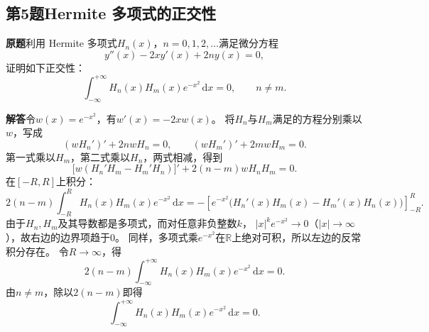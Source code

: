 \documentclass[11pt,a4paper]{ctexart}
\newcommand{\R}{\mathbb R}
\newcommand{\dd}{\,\mathrm d}
\newcommand{\problem}{\par\textbf{原题}\quad}
\newcommand{\solution}{\par\medskip\textbf{解答}\quad}
\begin{document}
\newpage
\subsection*{第5题\quad Hermite 多项式的正交性}
\problem 利用 Hermite 多项式$H_n(x)$，$n=0,1,2,\ldots$满足微分方程
\[
 y''(x)-2xy'(x)+2ny(x)=0,
\]
证明如下正交性：
\[
 \int_{-\infty}^{+\infty}H_n(x)H_m(x)e^{-x^2}\dd x=0,
 \qquad n\ne m.
\]

\solution 令$w(x)=e^{-x^2}$，有$w'(x)=-2xw(x)$。
将$H_n$与$H_m$满足的方程分别乘以$w$，写成
\[
 (wH_n')'+2nwH_n=0,\qquad
 (wH_m')'+2mwH_m=0.
\]
第一式乘以$H_m$，第二式乘以$H_n$，两式相减，得到
\[
 \bigl[w(H_n'H_m-H_m'H_n)\bigr]'
       +2(n-m)wH_nH_m=0.
\]
在$[-R,R]$上积分：
\[
 2(n-m)\int_{-R}^{R}H_n(x)H_m(x)e^{-x^2}\dd x
 =-\left[e^{-x^2}
       \bigl(H_n'(x)H_m(x)-H_m'(x)H_n(x)\bigr)\right]_{-R}^{R}.
\]
由于$H_n,H_m$及其导数都是多项式，而对任意非负整数$k$，
$|x|^k e^{-x^2}\to0$（$|x|\to\infty$），故右边的边界项趋于$0$。
同样，多项式乘$e^{-x^2}$在$\R$上绝对可积，所以左边的反常积分存在。
令$R\to\infty$，得
\[
 2(n-m)\int_{-\infty}^{+\infty}H_n(x)H_m(x)e^{-x^2}\dd x=0.
\]
由$n\ne m$，除以$2(n-m)$即得
\[
 \boxed{\displaystyle\int_{-\infty}^{+\infty}
             H_n(x)H_m(x)e^{-x^2}\dd x=0.}
\]
\end{document}
